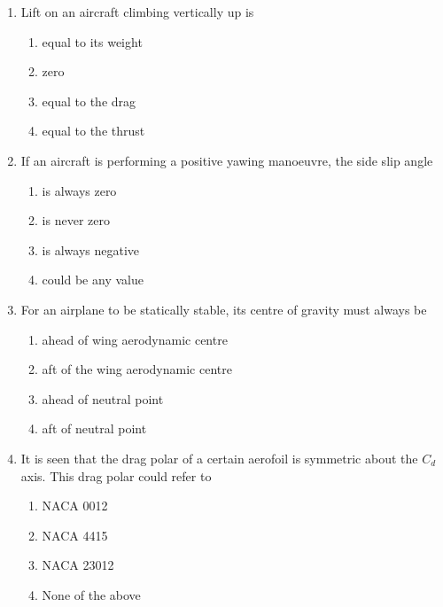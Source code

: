 \documentclass{article}
\begin{document}
\begin{enumerate}
\item Lift on an aircraft climbing vertically up is
\begin{multicols}{2}
\begin{enumerate}
\item equal to its weight
\item zero
\item equal to the drag
\item equal to the thrust
\end{enumerate}
\end{multicols}

\item If an aircraft is performing a positive yawing manoeuvre, the side slip angle
\begin{multicols}{4}
\begin{enumerate}
\item is always zero
\item is never zero
\item is always negative
\item could be any value
\end{enumerate}
\end{multicols}

\item For an airplane to be statically stable, its centre of gravity must always be
\begin{multicols}{2}
\begin{enumerate}
\item ahead of wing aerodynamic centre
\item aft of the wing aerodynamic centre
\item ahead of neutral point
\item aft of neutral point
\end{enumerate}
\end{multicols}

\item It is seen that the drag polar of a certain aerofoil is symmetric about the $C_d$ axis. This drag polar could refer to
\begin{multicols}{4}
\begin{enumerate}
\item NACA 0012
\item NACA 4415
\item NACA 23012
\item None of the above
\end{enumerate}
\end{multicols}


\end{enumerate}
\end{document}
